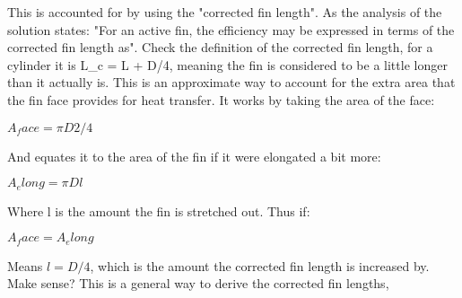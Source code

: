 
This is accounted for by using the "corrected fin length".  As the analysis of the solution states: "For an active fin, the efficiency may be expressed in terms of the corrected fin length as".  Check the definition of the corrected fin length, for a cylinder it is L_c = L + D/4, meaning the fin is considered to be a little longer than it actually is.  This is an approximate way to account for the extra area that the fin face provides for heat transfer.  It works by taking the area of the face:

$A_face = \pi D2 / 4$

And equates it to the area of the fin if it were elongated a bit more:

$A_elong = \pi D l$

Where l is the amount the fin is stretched out.  Thus if:

$A_face = A_elong$

Means $l = D/4$, which is the amount the corrected fin length is increased by.  Make sense?  This is a general way to derive the corrected fin lengths,
